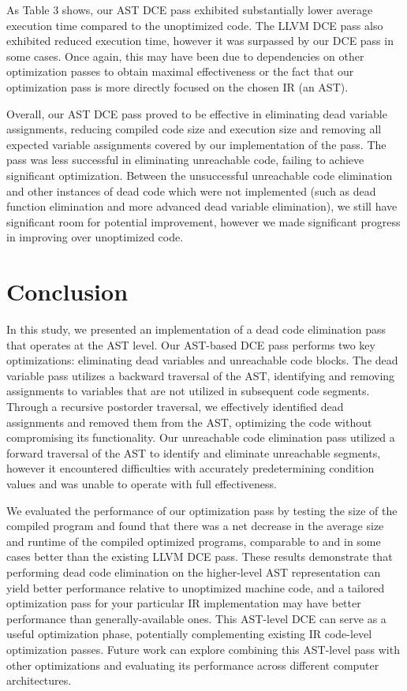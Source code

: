 \documentclass[sigconf]{acmart}
\begin{document}
As Table 3 shows, our AST DCE pass exhibited substantially lower average execution time compared to the unoptimized code. The LLVM DCE pass also exhibited reduced execution time, however it was surpassed by our DCE pass in some cases. Once again, this may have been due to dependencies on other optimization passes to obtain maximal effectiveness or the fact that our optimization pass is more directly focused on the chosen IR (an AST).

Overall, our AST DCE pass proved to be effective in eliminating dead variable assignments, reducing compiled code size and execution size and removing all expected variable assignments covered by our implementation of the pass. The pass was less successful in eliminating unreachable code, failing to achieve significant optimization. Between the unsuccessful unreachable code elimination and other instances of dead code which were not implemented (such as dead function elimination and more advanced dead variable elimination), we still have significant room for potential improvement, however we made significant progress in improving over unoptimized code.

\section{Conclusion}
In this study, we presented an implementation of a dead code elimination pass that operates at the AST level. Our AST-based DCE pass performs two key optimizations: eliminating dead variables and unreachable code blocks. The dead variable pass utilizes a backward traversal of the AST, identifying and removing assignments to variables that are not utilized in subsequent code segments. Through a recursive postorder traversal, we effectively identified dead assignments and removed them from the AST, optimizing the code without compromising its functionality. Our unreachable code elimination pass utilized a forward traversal of the AST to identify and eliminate unreachable segments, however it encountered difficulties with accurately predetermining condition values and was unable to operate with full effectiveness.

We evaluated the performance of our optimization pass by testing the size of the compiled program and found that there was a net decrease in the average size and runtime of the compiled optimized programs, comparable to and in some cases better than the existing LLVM DCE pass. These results demonstrate that performing dead code elimination on the higher-level AST representation can yield better performance  relative to unoptimized machine code, and a tailored optimization pass for your particular IR implementation may have better performance than generally-available ones. This AST-level DCE can serve as a useful optimization phase, potentially complementing existing IR code-level optimization passes. Future work can explore combining this AST-level pass with other optimizations and evaluating its performance across different computer architectures.
\end{document}
